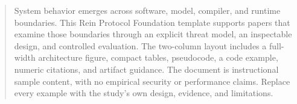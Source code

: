 \begin{abstract}
System behavior emerges across software, model, compiler, and runtime
boundaries. This Rein Protocol Foundation template supports papers that examine those
boundaries through an explicit threat model, an inspectable design, and
controlled evaluation. The two-column layout includes a full-width
architecture figure, compact tables, pseudocode, a code example, numeric
citations, and artifact guidance. The document is instructional sample
content, with no empirical security or performance claims. Replace every
example with the study's own design, evidence, and limitations.
\end{abstract}
